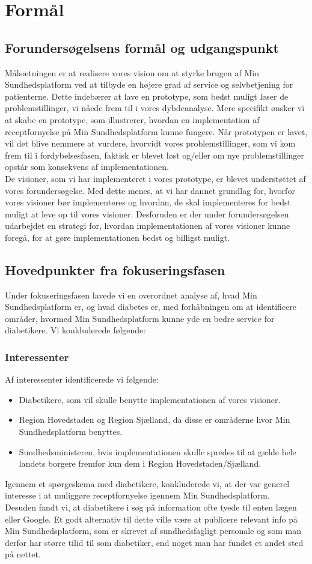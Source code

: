 \section{Formål}
\subsection{Forundersøgelsens formål og udgangspunkt}
Målsætningen er at realisere vores vision om at styrke brugen af Min Sundhedsplatform ved at tilbyde en højere grad af service og selvbetjening for patienterne. Dette indebærer at lave en prototype, som bedst muligt løser de problemstillinger, vi nåede frem til i vores dybdeanalyse. Mere specifikt ønsker vi at skabe en prototype, som illustrerer, hvordan en implementation af receptfornyelse på Min Sundhedsplatform kunne fungere. Når prototypen er lavet, vil det blive nemmere at vurdere, hvorvidt vores problemstillinger, som vi kom frem til i fordybelsesfasen, faktisk er blevet løst og/eller om nye problemstillinger opstår som konsekvens af implementationen.\\
De visioner, som vi har implementeret i vores prototype, er blevet understøttet af vores forundersøgelse. Med dette menes, at vi har dannet grundlag for, hvorfor vores visioner bør implementeres og hvordan, de skal implementeres for bedst muligt at leve op til vores visioner. Desforuden er der under forundersøgelsen udarbejdet en strategi for, hvordan implementationen af vores visioner kunne foregå, for at gøre implementationen bedst og billigst muligt. 
\subsection{Hovedpunkter fra fokuseringsfasen}
Under fokuseringsfasen lavede vi en overordnet analyse af, hvad Min Sundhedsplatform er, og hvad diabetes er, med forhåbningen om at identificere områder, hvormed Min Sundhedsplatform kunne yde en bedre service for diabetikere. Vi konkluderede følgende:
\subsubsection{Interessenter}
Af interessenter identificerede vi følgende:
\begin{itemize}
\item Diabetikere, som vil skulle benytte implementationen af vores visioner.
\item Region Hovedstaden og Region Sjælland, da disse er områderne hvor Min Sundhedsplatform benyttes.
\item Sundhedsministeren, hvis implementationen skulle spredes til at gælde hele landets borgere fremfor kun dem i Region Hovedstaden/Sjælland.
\end{itemize}
Igennem et spørgeskema med diabetikere, konkluderede vi, at der var generel interesse i at muliggøre receptfornyelse igennem Min Sundhedsplatform.\\
Desuden fandt vi, at diabetikere i søg på information ofte tyede til enten lægen eller Google. Et godt alternativ til dette ville være at publicere relevant info på Min Sundhedsplatform, som er skrevet af sundhedsfagligt personale og som man derfor har større tilid til som diabetiker, end noget man har fundet et andet sted på nettet. 
